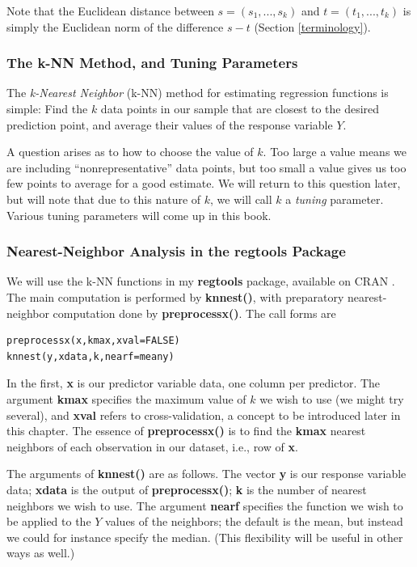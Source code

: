 Note that the Euclidean distance between $s = (s_1,...,s_k)$ and $t =
(t_1,...,t_k)$ is simply the Euclidean norm of the difference $s-t$
(Section \ref{terminology}).

\subsubsection{The k-NN Method, and Tuning Parameters}
\label{knnmethod}

The {\it k-Nearest Neighbor} (k-NN) method for estimating regression
functions is simple:  Find the $k$ data points in our sample that are
closest to the desired prediction point, and average their values of the
response variable $Y$.  

A question arises as to how to choose the value of $k$.  Too large a
value means we are including ``nonrepresentative'' data points, but too
small a value gives us too few points to average for a good estimate.
We will return to this question later, but will note that due to this
nature of $k$, we will call  $k$ a {\it tuning} parameter.  Various tuning
parameters will come up in this book.

\subsubsection{Nearest-Neighbor Analysis in the regtools Package}

We will use the k-NN functions in my {\bf regtools} package, available
on CRAN \cite{regtools}.  The main computation is performed by {\bf
knnest()}, with preparatory nearest-neighbor computation done by {\bf
preprocessx()}.  The call forms are

\begin{lstlisting}
preprocessx(x,kmax,xval=FALSE)
knnest(y,xdata,k,nearf=meany)
\end{lstlisting}

In the first, {\bf x} is our predictor variable data, one column per
predictor.  The argument {\bf kmax} specifies the maximum value of $k$
we wish to use (we might try several), and {\bf xval} refers to
cross-validation, a concept to be introduced later in this chapter.  The
essence of {\bf preprocessx()} is to find the {\bf kmax} nearest
neighbors of each observation in our dataset, i.e., row of {\bf x}.

The arguments of {\bf knnest()} are as follows. The vector {\bf y} is
our response variable data; {\bf xdata} is the output of {\bf
preprocessx()}; {\bf k} is the number of nearest neighbors we wish to
use. The argument {\bf nearf} specifies the function we wish to be
applied to the $Y$ values of the neighbors; the default is the mean,
but instead we could for instance specify the median.  (This flexibility
will be useful in other ways as well.)

